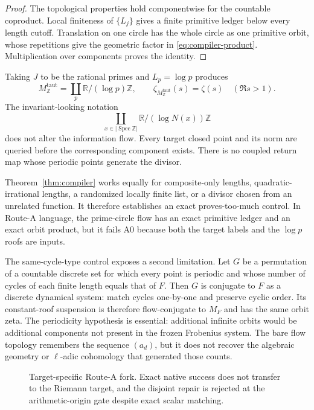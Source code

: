 \documentclass[11pt]{article}
\theoremstyle{definition}
\theoremstyle{remark}
\newcommand{\R}{\mathbb{R}}
\newcommand{\Z}{\mathbb{Z}}
\newcommand{\Spec}{\operatorname{Spec}}
\begin{document}
\begin{proof}
The topological properties hold componentwise for the countable coproduct.
Local finiteness of \(\{L_j\}\) gives a finite primitive ledger below every
length cutoff.  Translation on one circle has the whole circle as one
primitive orbit, whose repetitions give the geometric factor in
\eqref{eq:compiler-product}.  Multiplication over components proves the
identity.
\end{proof}

Taking \(J\) to be the rational primes and \(L_p=\log p\) produces
\begin{equation}
  M_{\Z}^{\mathrm{taut}}
   =\coprod_p\R/(\log p)\Z,
  \qquad
  \zeta_{M_{\Z}^{\mathrm{taut}}}(s)=\zeta(s)
  \quad(\Re s>1).
  \label{eq:prime-compiler}
\end{equation}
The invariant-looking notation
\[
  \coprod_{x\in|\Spec\Z|}\R/(\log N(x))\Z
\]
does not alter the information flow.  Every target closed point and its norm
are queried before the corresponding component exists.  There is no coupled
return map whose periodic points generate the divisor.

Theorem~\ref{thm:compiler} works equally for composite-only lengths,
quadratic-irrational lengths, a randomized locally finite list, or a divisor
chosen from an unrelated function.  It therefore establishes an exact
proves-too-much control.  In Route-A language, the prime-circle flow has an
exact primitive ledger and an exact orbit product, but it fails A0 because
both the target labels and the \(\log p\) roofs are inputs.

The same-cycle-type control exposes a second limitation.  Let \(G\) be a
permutation of a countable discrete set for which every point is periodic and
whose number of cycles of each finite length equals that of \(F\).  Then \(G\)
is conjugate to \(F\) as a discrete dynamical system: match cycles one-by-one
and preserve cyclic order.  Its constant-roof suspension is therefore
flow-conjugate to \(M_F\) and has the same orbit zeta.  The periodicity
hypothesis is essential: additional infinite orbits would be additional
components not present in the frozen Frobenius system.  The bare flow topology
remembers the sequence \((a_d)\), but it does not recover the algebraic
geometry or \(\ell\)-adic cohomology that generated those counts.

\begin{figure}[t]
  \centering
  
  \caption{Target-specific Route-A fork.  Exact native success does not
  transfer to the Riemann target, and the disjoint repair is rejected at the
  arithmetic-origin gate despite exact scalar matching.}
  \label{fig:fork}
\end{figure}
\end{document}
